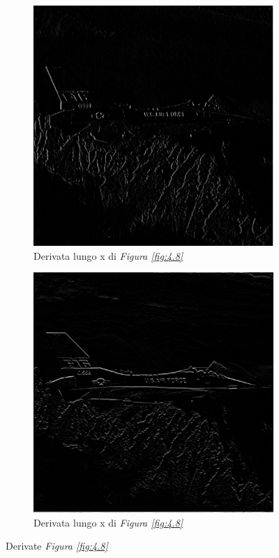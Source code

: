 \documentclass{subfiles}
\begin{document}
\begin{figure}[!h]
    \centering
    \begin{subfigure}[b]{0.4\textwidth}
        \centering
        \includegraphics[scale = 0.3]{../Images/Airplane/DeXAirplane.png}
        \caption{Derivata lungo x di \emph{Figura \ref{fig:4.8}}}
        \label{fig:4.9.a}
    \end{subfigure}
    \hspace{10pt}
    \begin{subfigure}[b]{0.4\textwidth}
        \centering
        \includegraphics[scale = 0.3]{../Images/Airplane/DeYAirplane.png}
        \caption{Derivata lungo x di \emph{Figura \ref{fig:4.8}}}
        \label{fig:4.9.b}
    \end{subfigure}
    \caption{Derivate \emph{Figura \ref{fig:4.8}}}
    \label{fig:4.9}
\end{figure}
\end{document}
